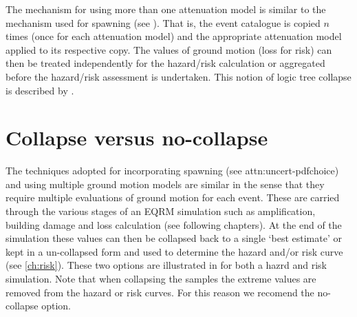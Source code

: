 The mechanism for using more than one attenuation model is similar
to the mechanism used for spawning (see
). That is, the event catalogue is
copied $n$ times (once for each attenuation model) and the
appropriate attenuation model applied to its respective copy. The
values of ground motion (loss for risk) can then be treated
independently for the hazard/risk calculation or aggregated before
the hazard/risk assessment is undertaken. This notion of logic tree
collapse is described by .


\section{Collapse versus no-collapse}

The techniques adopted for incorporating spawning (see \sref
{attn:uncert-pdfchoice}) and using multiple ground motion models are
similar in the sense that they require multiple evaluations of
ground motion for each event. These are carried through the various
stages of an EQRM simulation such as amplification, building damage
and loss calculation (see following chapters). At the end of the
simulation these values can then be collapsed back to a single `best
estimate' or kept in a un-collapsed form and used to determine the
hazard and/or risk curve (see \cref{ch:risk}). These two options are
illustrated in  for both a hazrd and
risk simulation. Note that when collapsing the samples the extreme
values are removed from the hazard or risk curves. For this reason
we recomend the no-collapse option.

